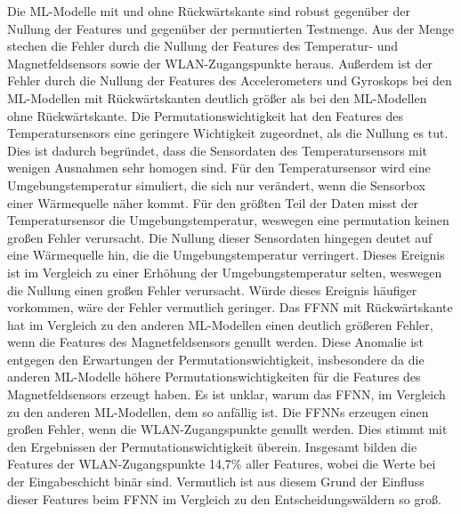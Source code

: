 \newline
\newline
Die ML-Modelle mit und ohne Rückwärtskante sind robust gegenüber der Nullung der Features und gegenüber der permutierten Testmenge.
Aus der Menge stechen die Fehler durch die Nullung der Features des Temperatur- und Magnetfeldsensors sowie der WLAN-Zugangspunkte heraus.
Außerdem ist der Fehler durch die Nullung der Features des Accelerometers und Gyroskops bei den ML-Modellen mit Rückwärtskanten
deutlich größer als bei den ML-Modellen ohne Rückwärtskante.
\newline
\newline
Die Permutationswichtigkeit hat den Features des Temperatursensors eine geringere Wichtigkeit zugeordnet, als die Nullung es tut.
Dies ist dadurch begründet, dass die Sensordaten des Temperatursensors mit wenigen Ausnahmen sehr homogen sind.
Für den Temperatursensor wird eine Umgebungstemperatur simuliert, die sich nur verändert, wenn die Sensorbox einer Wärmequelle näher kommt.
Für den größten Teil der Daten misst der Temperatursensor die Umgebungstemperatur, weswegen eine permutation keinen großen Fehler verursacht.
Die Nullung dieser Sensordaten hingegen deutet auf eine Wärmequelle hin, die die Umgebungstemperatur verringert.
Dieses Ereignis ist im Vergleich zu einer Erhöhung der Umgebungstemperatur selten, weswegen die Nullung einen großen Fehler verursacht.
Würde dieses Ereignis häufiger vorkommen, wäre der Fehler vermutlich geringer.
\newline
\newline
Das FFNN mit Rückwärtskante hat im Vergleich zu den anderen ML-Modellen einen deutlich größeren Fehler, wenn die Features des Magnetfeldsensors genullt werden.
Diese Anomalie ist entgegen den Erwartungen der Permutationswichtigkeit, insbesondere da die anderen ML-Modelle
höhere Permutationswichtigkeiten für die Features des Magnetfeldsensors erzeugt haben.
Es ist unklar, warum das FFNN, im Vergleich zu den anderen ML-Modellen, dem so anfällig ist.
\newline
\newline
Die FFNNs erzeugen einen großen Fehler, wenn die WLAN-Zugangspunkte genullt werden.
Dies stimmt mit den Ergebnissen der Permutationswichtigkeit überein.
Insgesamt bilden die Features der WLAN-Zugangspunkte 14,7\% aller Features, wobei die Werte bei der Eingabeschicht binär sind.
Vermutlich ist aus diesem Grund der Einfluss dieser Features beim FFNN im Vergleich zu den Entscheidungswäldern so groß.
\newline
